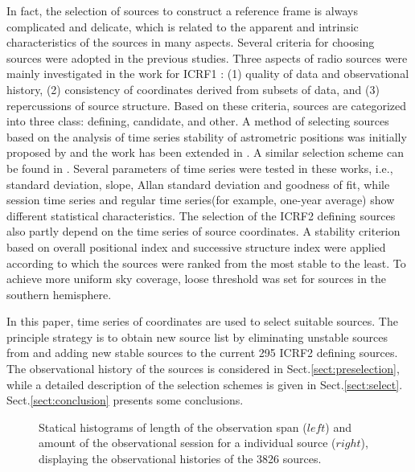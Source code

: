 \documentclass{aa}
\begin{document}
In fact, the selection of sources to construct a reference frame is always complicated and delicate, which is related to the apparent and intrinsic characteristics of the sources in many aspects. Several criteria for choosing sources were adopted in the previous studies. Three aspects of radio sources were mainly investigated in the work for ICRF1 \citep{arias2004,ma1998}: (1) quality of data and observational history, (2) consistency of coordinates derived from subsets of data, and (3) repercussions of source structure. Based on these criteria, sources are categorized into three class: defining, candidate, and other. A method of selecting sources based on the analysis of time series stability of astrometric positions was initially proposed by \cite{FV2003} and the work has been extended in \cite{FV2006}. A similar selection scheme can be found in \cite{gontier2008,Lambert2009}. Several parameters of time series were tested in these works, i.e., standard deviation, slope, Allan standard deviation and goodness of fit, while session time series and regular time series(for example, one-year average) show different statistical characteristics. The selection of the ICRF2 defining sources also partly depend on the time series \citep{2009ITN....35....1M,IERS2} of source coordinates. A stability criterion based on overall positional index and successive structure index were applied according to which the sources were ranked from the most stable to the least. To achieve more uniform sky coverage, loose threshold was set for sources in the southern hemisphere.

In this paper, time series of coordinates are used to select suitable sources. The principle strategy is to obtain new source list by eliminating unstable sources from and adding new stable sources to the current 295 ICRF2 defining sources. The observational history of the sources is considered in Sect.\ref{sect:preselection}, while a detailed description of the selection schemes is given in Sect.\ref{sect:select}. Sect.\ref{sect:conclusion} presents some conclusions.

\begin{figure*}[htb]
   \centering
      \caption{Statical histograms of length of the observation span ($left$) and amount of the observational session for a individual source ($right$), displaying the observational histories of the 3826 sources.
              }
         \label{Fig:Observation}
   \end{figure*}
\end{document}
